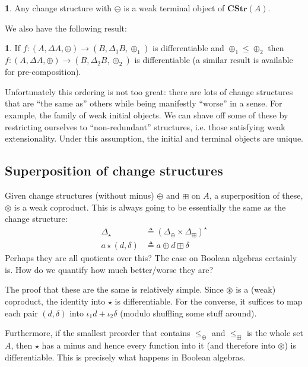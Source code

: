 \documentclass[english]{article}
\newcommand{\als}[1]{\begin{align*} #1 \end{align*}}
\newcommand{\A}[1]{\mathbf{#1}}
\theoremstyle{plain}
\theoremstyle{remark}
\theoremstyle{remark}
\theoremstyle{remark}
\theoremstyle{definition}
\theoremstyle{definition}
\newtheorem{prop}[thm]{\protect\propositionname}
\newcommand{\ra}[0]{\rightarrow}
\providecommand{\propositionname}{Proposition}
\begin{document}
\begin{prop}
  Any change structure with $\ominus$ is a weak terminal object of $\A{CStr}(A)$.
\end{prop}

We also have the following result:

\begin{prop}
  If $f : (A, \Delta A, \oplus) \ra (B, \Delta_1 B, \oplus_1)$ is differentiable and
  $\oplus_1 \leq \oplus_2$ then $f : (A, \Delta A, \oplus) \ra (B, \Delta_2 B, \oplus_2)$ is
  differentiable (a similar result is available for pre-composition).
\end{prop}

Unfortunately this ordering is not too great: there are lots of change structures that are
``the same as'' others while being manifestly ``worse'' in a sense. For example, the family of
weak initial objects. We can shave off some of these by restricting ourselves to ``non-redundant''
structures, i.e. those satisfying weak extensionality. Under this assumption, the initial
and terminal objects are unique.

\subsection{Superposition of change structures}

Given change structures (without minus) $\oplus$ and $\boxplus$ on $A$, a superposition of these,
$\circledast$ is a weak coproduct. This is always going to be essentially the same as the 
change structure:
\als{
  \Delta_\star &\triangleq (\Delta_\oplus \times \Delta_\boxplus)^\star\\
  a \star (d, \delta) &\triangleq a \oplus d \boxplus \delta
}
Perhaps they are all quotients over this? The case on Boolean algebras certainly is. How do we
quantify how much better/worse they are?

\newcommand{\cast}[0]{\circledast}
The proof that these are the same is relatively simple. Since $\cast$ is a (weak) coproduct, the
identity into $\star$ is differentiable. For the converse, it suffices to map each pair
$(d, \delta)$ into $\iota_1 d + \iota_2 \delta$ (modulo shuffling some stuff around).

Furthermore, if the smallest preorder that contains $\leq_\oplus$ and $\leq_\boxplus$ is the whole
set $A$, then $\star$ has a minus and hence every function into it (and therefore into $\cast$)
is differentiable. This is precisely what happens in Boolean algebras.
\end{document}
